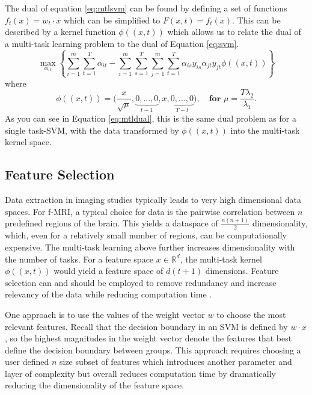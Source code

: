 \documentclass{llncs}
\begin{document}
The dual of equation \ref{eq:mtlsvm} can be found by defining a set of functions $f_t(x) = w_t \cdot x$ which can be simplified to $F(x,t) = f_t(x)$.  This can be described by a kernel function $\phi((x,t))$ which allows us to relate the dual of a multi-task learning problem to the dual of Equation \ref{eq:svm}.
\begin{equation}
\label{eq:mtldual}
\max_{\alpha_{it}}  \left\{ \sum_{i=1}^m\sum_{t=1}^T \alpha_{it} -  \sum_{i=1}^m\sum_{s=1}^T\sum_{j=1}^m\sum_{t=1}^T  \alpha_{is}y_{is}\alpha_{jt}y_{jt}\phi((x,t))      \right\}
\end{equation}
where
\begin{equation}
\phi((x,t)) = \big(\frac{x}{\sqrt{\mu}}, \underbrace{0,...,0}_{t-1}, x, \underbrace{0,...,0}_{T-t} \big), \quad \textbf{for  } \mu = \frac{T\lambda_2}{\lambda_1} .
\end{equation}
As you can see in Equation \ref{eq:mtldual}, this is the same dual problem as for a single task-SVM, with the data transformed by $\phi((x,t))$ into the multi-task kernel space.




\subsection{Feature Selection}
\label{subsec:FS}
Data extraction in imaging studies typically leads to very high dimensional data spaces.  For f-MRI, a typical choice for data is the pairwise correlation between $n$ predefined regions of the brain.  This yields a dataspace of $\frac{n(n+1)}{2}$ dimensionality, which, even for a relatively small number of regions, can be  computationally expensive.  The multi-task learning above further increases dimensionality with the number of tasks. For a feature space $x \in \mathbb{R}^d$, the multi-task kernel $\phi((x,t))$ would yield a feature space of $d(t+1)$ dimensions.  Feature selection can and should be employed to remove redundancy and increase relevancy of the data while reducing computation time \cite{featsel}.


One approach is to use the values of the weight vector $w$ to choose the most relevant features.  Recall that the decision boundary in an SVM is defined by $w \cdot x$, so the highest magnitudes in the weight vector denote the features that best define the decision boundary between groups.  This approach requires choosing a user defined $n$ size subset of features which introduces another parameter and layer of complexity but overall reduces computation time by dramatically reducing the dimensionality of the feature space.
\end{document}
